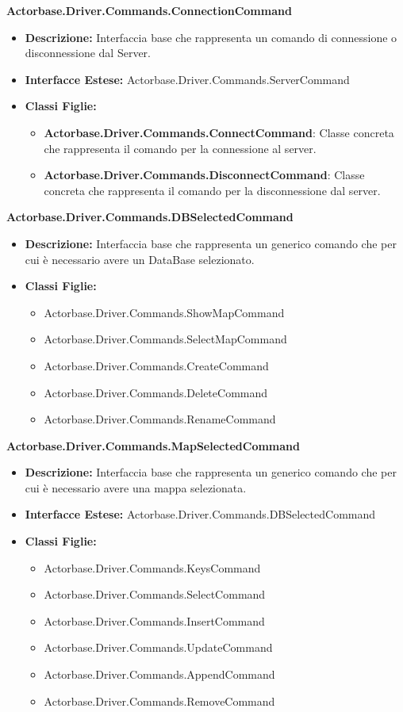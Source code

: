 \documentclass[a4paper]{article}
\begin{document}
		\textbf{Actorbase.Driver.Commands.ConnectionCommand}
		\begin{itemize}
				\item \textbf{Descrizione:} Interfaccia base che rappresenta un comando di connessione o disconnessione dal Server.
				\item \textbf{Interfacce Estese:} Actorbase.Driver.Commands.ServerCommand
				\item \textbf{Classi Figlie:}
					\begin{itemize}
						\item \textbf{Actorbase.Driver.Commands.ConnectCommand}:
							Classe concreta che rappresenta il comando per la connessione al server.
						\item \textbf{Actorbase.Driver.Commands.DisconnectCommand}:
							Classe concreta che rappresenta il comando per la disconnessione dal server.
					\end{itemize}
			\end{itemize}
		
		\textbf{Actorbase.Driver.Commands.DBSelectedCommand}
		\begin{itemize}
				\item \textbf{Descrizione:} Interfaccia base che rappresenta un generico comando che per cui è necessario avere un DataBase selezionato.
				\item \textbf{Classi Figlie:}
					\begin{itemize}
						\item Actorbase.Driver.Commands.ShowMapCommand
						\item Actorbase.Driver.Commands.SelectMapCommand
						\item Actorbase.Driver.Commands.CreateCommand
						\item Actorbase.Driver.Commands.DeleteCommand
						\item Actorbase.Driver.Commands.RenameCommand
					\end{itemize}
			\end{itemize}


		\textbf{Actorbase.Driver.Commands.MapSelectedCommand}
		\begin{itemize}
				\item \textbf{Descrizione:} Interfaccia base che rappresenta un generico comando che per cui è necessario avere una mappa selezionata.
				\item \textbf{Interfacce Estese:} Actorbase.Driver.Commands.DBSelectedCommand
				\item \textbf{Classi Figlie:}
					\begin{itemize}
						\item Actorbase.Driver.Commands.KeysCommand
						\item Actorbase.Driver.Commands.SelectCommand
						\item Actorbase.Driver.Commands.InsertCommand
						\item Actorbase.Driver.Commands.UpdateCommand
						\item Actorbase.Driver.Commands.AppendCommand
						\item Actorbase.Driver.Commands.RemoveCommand
					\end{itemize}
			\end{itemize}
	
\end{document}

